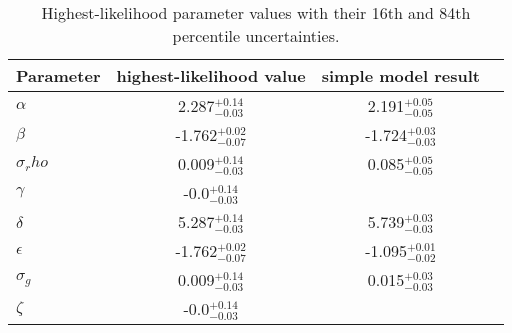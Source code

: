 \begin{table}
\caption{Highest-likelihood parameter values with their 16th and 84th
	percentile uncertainties.}
\begin{tabular}{lccc}
\hline\hline
Parameter & highest-likelihood value & simple model result \\
    \hline
    $\alpha$ &    2.287$_{-0.03}^{+0.14}$ &     2.191$_{-0.05}^{+0.05}$  \\
    $\beta$ &    -1.762$_{-0.07}^{+0.02}$ &     -1.724$_{-0.03}^{+0.03}$ \\
    $\sigma_rho$ &    0.009$_{-0.03}^{+0.14}$ & 0.085$_{-0.05}^{+0.05}$  \\
    $\gamma$ &    -0.0$_{-0.03}^{+0.14}$ &  \\
    $\delta$ &    5.287$_{-0.03}^{+0.14}$ &     5.739$_{-0.03}^{+0.03}$  \\
    $\epsilon$ &    -1.762$_{-0.07}^{+0.02}$ &  -1.095$_{-0.02}^{+0.01}$ \\
    $\sigma_g$ &    0.009$_{-0.03}^{+0.14}$ &   0.015$_{-0.03}^{+0.03}$  \\
    $\zeta$ &    -0.0$_{-0.03}^{+0.14}$ & \\
    \hline
\end{tabular}
\end{table}

